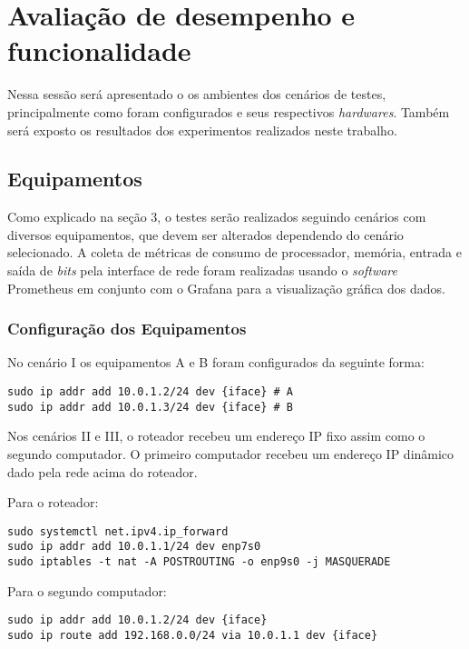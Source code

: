 \section{Avaliação de desempenho e funcionalidade}
Nessa sessão será apresentado o os ambientes dos cenários de testes, principalmente como foram configurados e seus respectivos \textit{hardwares}. Também será exposto os resultados dos experimentos realizados neste trabalho.
\subsection{Equipamentos}

Como explicado na seção 3, o testes serão realizados seguindo cenários com diversos equipamentos, que devem ser alterados dependendo do cenário selecionado.
A coleta de métricas de consumo de processador, memória, entrada e saída de \textit{bits} pela interface de rede
foram realizadas usando o \textit{software} Prometheus em conjunto com o Grafana para a visualização gráfica dos dados.




\subsubsection{Configuração dos Equipamentos}
No cenário I os equipamentos A e B foram configurados da seguinte forma:

\begin{lstlisting}
sudo ip addr add 10.0.1.2/24 dev {iface} # A
sudo ip addr add 10.0.1.3/24 dev {iface} # B
\end{lstlisting}

Nos cenários II e III, o roteador recebeu um endereço \ac{IP} fixo assim como o segundo computador. O primeiro computador recebeu um endereço \ac{IP} dinâmico dado pela rede acima do roteador.

Para o roteador: 

\begin{lstlisting}
sudo systemctl net.ipv4.ip_forward 
sudo ip addr add 10.0.1.1/24 dev enp7s0 
sudo iptables -t nat -A POSTROUTING -o enp9s0 -j MASQUERADE 
\end{lstlisting}

Para o segundo computador:
\begin{lstlisting}
sudo ip addr add 10.0.1.2/24 dev {iface}
sudo ip route add 192.168.0.0/24 via 10.0.1.1 dev {iface}
\end{lstlisting}




